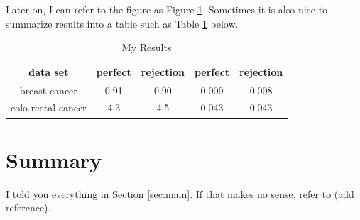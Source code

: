 \documentclass[12pt]{article}
\begin{document}
\begin{figure}\label{fig:foo}
\begin{center}
\end{center}
\end{figure}

Later on, I can refer to the figure as Figure \ref{fig:foo}. 
Sometimes it is also nice to summarize results into a table such as Table \ref{tab:results} below.
\begin{table}
  \caption{\label{tab:results} My Results}
  \centering
    \begin{tabular}{|c|c|c|c|c|}
      \hline
      data set
      & perfect & rejection & perfect & rejection\\
      \hline
      breast cancer      & 0.91 & 0.90 & 0.009 & 0.008\\
      colo-rectal cancer & 4.3 & 4.5 & 0.043 & 0.043\\
      \hline
    \end{tabular}
\end{table}

\section{Summary}\label{sec:model}
I told you everything in Section \ref{sec:main}. If that makes no sense, refer to (add reference).

 
%
\end{document}
